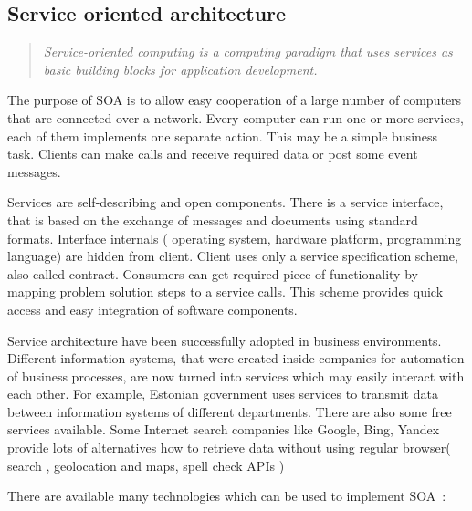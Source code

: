 \subsection{Service oriented architecture}
\begin{quote}
\textit{
Service-oriented computing is a computing paradigm that uses services as basic building blocks for
application development.}
~\cite {lws_milanovic.pdf}
\end{quote} 

The purpose of SOA is to allow easy cooperation of a large number of
computers that are connected over a network.
Every computer can run one or more services, each of them implements one
separate action. This may be a simple business task. Clients can make calls
and receive required data or post some event messages.

Services are self-describing and open components. There is a service interface,
that is based on the exchange of messages and documents using standard formats.
Interface internals ( operating system, hardware platform, programming language)
are hidden from client. Client uses only a service specification scheme, also
called contract. Consumers can get required piece of functionality by mapping problem
solution steps to a service calls. This scheme provides quick access and easy integration of software components.


Service architecture have been successfully adopted in
business environments. Different information systems, that were created inside
companies for automation of business processes,  are now turned into services
which may easily interact with each other. For example, Estonian government uses
services to transmit data between information systems of different departments.
There are also some free services available. Some Internet search companies like
Google, Bing, Yandex provide lots of alternatives how to retrieve data without
using regular browser( search , geolocation and maps,  spell check \gls{API}s )

There are available many technologies which can be used to implement
SOA~\cite{wikipedia:SOA}:

